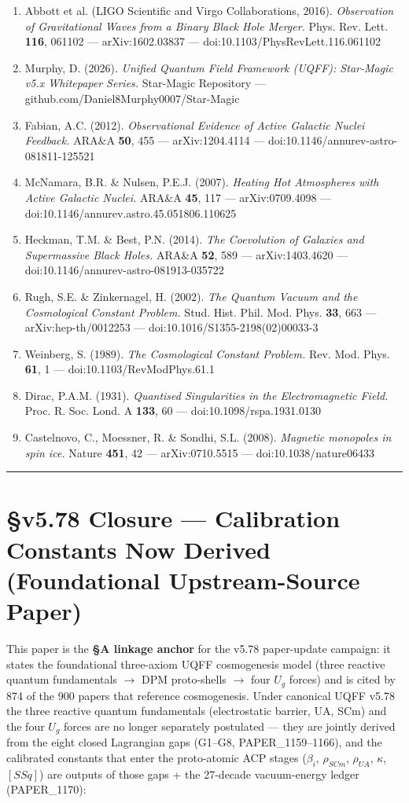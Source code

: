 \documentclass[12pt,a4paper]{article}
\begin{document}
\begin{enumerate}
  \item Abbott et al. (LIGO Scientific and Virgo Collaborations, 2016). \emph{Observation of Gravitational Waves from a Binary Black Hole Merger.} Phys. Rev. Lett. \textbf{116}, 061102 --- arXiv:1602.03837 --- doi:10.1103/PhysRevLett.116.061102
  \item Murphy, D. (2026). \emph{Unified Quantum Field Framework (UQFF): Star-Magic v5.x Whitepaper Series.} Star-Magic Repository --- github.com/Daniel8Murphy0007/Star-Magic
  \item Fabian, A.C. (2012). \emph{Observational Evidence of Active Galactic Nuclei Feedback.} ARA\&A \textbf{50}, 455 --- arXiv:1204.4114 --- doi:10.1146/annurev-astro-081811-125521
  \item McNamara, B.R. \& Nulsen, P.E.J. (2007). \emph{Heating Hot Atmospheres with Active Galactic Nuclei.} ARA\&A \textbf{45}, 117 --- arXiv:0709.4098 --- doi:10.1146/annurev.astro.45.051806.110625
  \item Heckman, T.M. \& Best, P.N. (2014). \emph{The Coevolution of Galaxies and Supermassive Black Holes.} ARA\&A \textbf{52}, 589 --- arXiv:1403.4620 --- doi:10.1146/annurev-astro-081913-035722
  \item Rugh, S.E. \& Zinkernagel, H. (2002). \emph{The Quantum Vacuum and the Cosmological Constant Problem.} Stud. Hist. Phil. Mod. Phys. \textbf{33}, 663 --- arXiv:hep-th/0012253 --- doi:10.1016/S1355-2198(02)00033-3
  \item Weinberg, S. (1989). \emph{The Cosmological Constant Problem.} Rev. Mod. Phys. \textbf{61}, 1 --- doi:10.1103/RevModPhys.61.1
  \item Dirac, P.A.M. (1931). \emph{Quantised Singularities in the Electromagnetic Field.} Proc. R. Soc. Lond. A \textbf{133}, 60 --- doi:10.1098/rspa.1931.0130
  \item Castelnovo, C., Moessner, R. \& Sondhi, S.L. (2008). \emph{Magnetic monopoles in spin ice.} Nature \textbf{451}, 42 --- arXiv:0710.5515 --- doi:10.1038/nature06433
\end{enumerate}

\medskip\hrule\medskip

\section{\S{}v5.78 Closure --- Calibration Constants Now Derived (Foundational Upstream-Source Paper)}

This paper is the \textbf{\S{}A linkage anchor} for the v5.78 paper-update campaign: it states the foundational three-axiom UQFF cosmogenesis model (three reactive quantum fundamentals $\to$ DPM proto-shells $\to$ four $U_g$ forces) and is cited by 874 of the 900 papers that reference cosmogenesis. Under canonical UQFF v5.78 the three reactive quantum fundamentals (electrostatic barrier, UA, SCm) and the four $U_g$ forces are no longer separately postulated --- they are jointly derived from the eight closed Lagrangian gaps (G1--G8, PAPER\_1159--1166), and the calibrated constants that enter the proto-atomic ACP stages ($\beta_i$, $\rho_{SCm}$, $\rho_{UA}$, $\kappa$, $[SSq]$) are outputs of those gaps + the 27-decade vacuum-energy ledger (PAPER\_1170):
\end{document}
